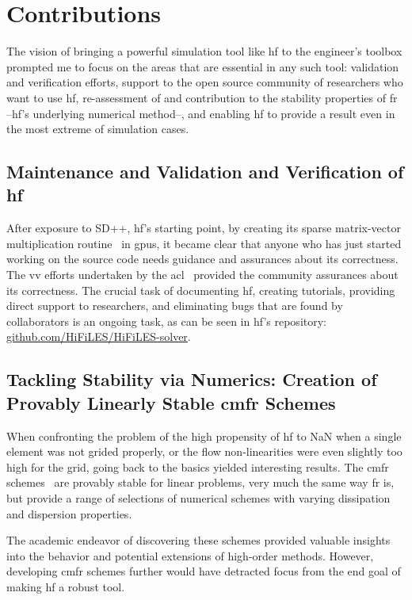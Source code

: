 \section{Contributions}

The vision of bringing a powerful simulation tool like \gls{hf} to the engineer's toolbox prompted me to focus on the areas that are essential in any such tool: validation and verification efforts, support to the open source community of researchers who want to use \gls{hf}, re-assessment of and contribution to the stability properties of \gls{fr} --\gls{hf}'s underlying numerical method--, and enabling \gls{hf} to provide a result even in the most extreme of simulation cases.
\subsection{Maintenance and Validation and Verification of \gls{hf}}
After exposure to SD++, \gls{hf}'s starting point, by creating its sparse matrix-vector multiplication routine~\cite{castonguay2011} in \gls{gpu}s, it became clear that anyone who has just started working on the source code needs guidance and assurances about its correctness. The \gls{vv} efforts undertaken by the \gls{acl}~\cite{lopez2014verification} provided the community assurances about its correctness. The crucial task of documenting \gls{hf}, creating tutorials, providing direct support to researchers, and eliminating bugs that are found by collaborators is an ongoing task, as can be seen in \gls{hf}'s repository: \url{github.com/HiFiLES/HiFiLES-solver}.

\subsection{Tackling Stability via Numerics: Creation of Provably Linearly Stable \gls{cmfr} Schemes}
When confronting the problem of the high propensity of \gls{hf} to NaN when a single element was not grided properly, or the flow non-linearities were even slightly too high for the grid, going back to the basics yielded interesting results. The \gls{cmfr} schemes~\cite{lopez2015cmfr} are provably stable for linear problems, very much the same way \gls{fr} is, but provide a range of selections of numerical schemes with varying dissipation and dispersion properties.

The academic endeavor of discovering these schemes provided valuable insights into the behavior and potential extensions of high-order methods. However, developing \gls{cmfr} schemes further would have detracted focus from the end goal of making \gls{hf} a robust tool.

